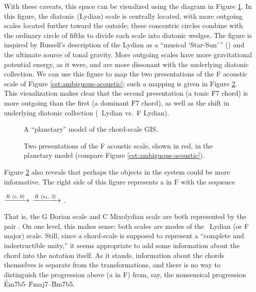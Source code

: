 With these caveats, this space can be visualized using the diagram in Figure
\ref{cst:polar-gis}. In this figure, the diatonic (Lydian) scale is centrally
located, with more outgoing scales located further toward the outside; these
concentric circles combine with the ordinary circle of fifths to divide each
scale into diatonic wedges. The figure is inspired by Russell's
description of the Lydian as a ``musical `Star-Sun'\,'' () and the
ultimate source of tonal gravity. More outgoing scales have more gravitational
potential energy, as it were, and are more dissonant with the underlying
diatonic collection. We can use this figure to map the two presentations of
the F acoustic scale of Figure \ref{cst:ambiguous-acoustic}; such a mapping is
given in Figure \ref{cst:polar-acoustic}. This visualization makes clear that
the second presentation (a tonic \h{F7} chord) is more outgoing than the first
(a dominant \h{F7} chord), as well as the shift in underlying diatonic
collection (\Eflat\ Lydian vs.\ F Lydian).

\begin{figure}[tbp]
  \caption{A ``planetary'' model of the chord-scale \textsc{GIS}.}
  \label{cst:polar-gis}
\end{figure}

\begin{figure}[tbp]
  \caption[Two presentations of the F acoustic scale in the planetary
  model.]{Two presentations of the F acoustic scale, shown in red, in the
    planetary model (compare Figure \ref{cst:ambiguous-acoustic}).}
  \label{cst:polar-acoustic}
\end{figure}

Figure \ref{cst:polar-acoustic} also reveals that perhaps the objects in the
system could be more informative. The right side of this figure represents a
\tfo in F with the sequence \\
{ \centering
   $\xrightarrow{R\text{ \mbox{\ensuremath{\langle}$e$, $0$\ensuremath{\rangle}} }}$
   $\xrightarrow{R\text{ \mbox{\ensuremath{\langle}$s_1$, $3$\ensuremath{\rangle}} }}$
  .
  \par
}
\noindent That is, the G Dorian scale and C Mixolydian scale are both
represented by the pair . On one level, this makes
sense: both scales are modes of the \Bflat\ Lydian (or F major) scale. Still,
since a chord-scale is supposed to represent a ``complete and indestructible
unity,'' it seems appropriate to add some information about the chord into the
notation itself. As it stands, information about the chords themselves is
separate from the transformations, and there is no way to distinguish the
progression above (a \tfo in F) from, say, the nonsensical progression
\mbox{\h{Em7b5}--\h{Fmaj7}--\h{Bm7b5}}.

